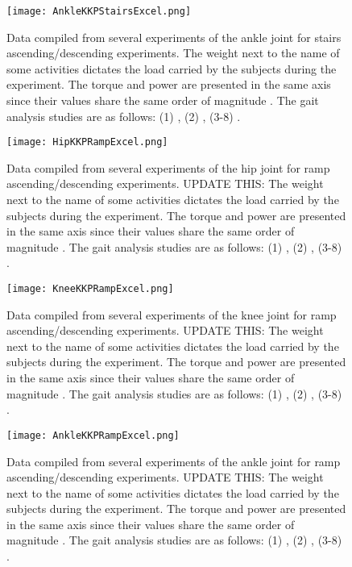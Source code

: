 \begin{appendix}
\begin{figure}[htbp]
    \centering
    \texttt{[image: AnkleKKPStairsExcel.png]}
    \caption{Data compiled from several experiments of the ankle joint for stairs ascending/descending experiments. The weight next to the name of some activities dictates the load carried by the subjects during the experiment. The torque and power are presented in the same axis since their values share the  same order of magnitude \cite{solis2017characterization}. The gait analysis studies are as follows: (1) \cite{bovi2011multiple}, (2) \cite{lee2008biomechanics}, (3-8) \cite{han2011biomechanical}. }
    \label{fig:ankleKKPStairs}
\end{figure}

\begin{figure}[htbp]
    \centering
    \texttt{[image: HipKKPRampExcel.png]}
    \caption{Data compiled from several experiments of the hip joint for ramp ascending/descending experiments. UPDATE THIS: The weight next to the name of some activities dictates the load carried by the subjects during the experiment. The torque and power are presented in the same axis since their values share the  same order of magnitude \cite{solis2017characterization}. The gait analysis studies are as follows: (1) \cite{bovi2011multiple}, (2) \cite{lee2008biomechanics}, (3-8) \cite{han2011biomechanical}. }
    \label{fig:hipKKPRamp}
\end{figure}

\begin{figure}[htbp]
    \centering
    \texttt{[image: KneeKKPRampExcel.png]}
    \caption{Data compiled from several experiments of the knee joint for ramp ascending/descending experiments. UPDATE THIS: The weight next to the name of some activities dictates the load carried by the subjects during the experiment. The torque and power are presented in the same axis since their values share the  same order of magnitude \cite{solis2017characterization}. The gait analysis studies are as follows: (1) \cite{bovi2011multiple}, (2) \cite{lee2008biomechanics}, (3-8) \cite{han2011biomechanical}. }
    \label{fig:kneeKKPRamp}
\end{figure}

\begin{figure}[htbp]
    \centering
    \texttt{[image: AnkleKKPRampExcel.png]}
    \caption{Data compiled from several experiments of the ankle joint for ramp ascending/descending experiments. UPDATE THIS: The weight next to the name of some activities dictates the load carried by the subjects during the experiment. The torque and power are presented in the same axis since their values share the  same order of magnitude \cite{solis2017characterization}. The gait analysis studies are as follows: (1) \cite{bovi2011multiple}, (2) \cite{lee2008biomechanics}, (3-8) \cite{han2011biomechanical}. }
    \label{fig:ankleKKPRamp}
\end{figure}


\end{appendix}
